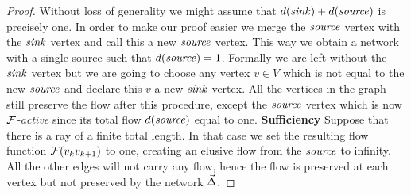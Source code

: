 \documentclass[12pt]{article}
\begin{document}
    \begin{proof}
      Without loss of generality we might assume that $d(\mathit{sink}) + d(\mathit{source})$ is precisely one.
      In order to make our proof easier we merge the $\mathit{source}$ vertex with the $\mathit{sink}$ vertex and call this a
        new $\mathit{source}$ vertex.
      This way we obtain a network with a single source such that $d(\mathit{source}) = 1$.
      Formally we are left without the $\mathit{sink}$ vertex but we are going to choose any vertex $v \in V$ which
        is not equal to the new $\mathit{source}$ and declare this $v$ a new $\mathit{sink}$ vertex.
      All the vertices in the graph still preserve the flow after this procedure, except the $\mathit{source}$ vertex
        which is now \emph{$\mathcal{F}$-active} since its total flow $d(\mathit{source})$ equal to one.
      \noindent\textbf{Sufficiency}
      Suppose that there is a ray of a finite total length. 
      In that case we set the resulting flow function $\mathcal{F}(v_k v_{k+1})$ to one, creating an elusive flow
        from the $\mathit{source}$ to infinity. All the other edges will not carry any flow, hence the flow is preserved
        at each vertex but not preserved by the network $\vec{\Delta}$.


\end{proof}
\end{document}
